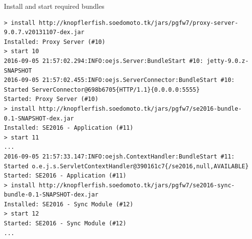 \documentclass[conference]{IEEEtran}
\begin{document}
\begin{listing}
    \caption{Install and start required bundles}
    \begin{verbatim}
> install http://knopflerfish.soedomoto.tk/jars/pgfw7/proxy-server-9.0.7.v20131107-dex.jar
Installed: Proxy Server (#10)
> start 10
2016-09-05 21:57:02.294:INFO:oejs.Server:BundleStart #10: jetty-9.0.z-SNAPSHOT
2016-09-05 21:57:02.455:INFO:oejs.ServerConnector:BundleStart #10: Started ServerConnector@698b6705{HTTP/1.1}{0.0.0.0:5555}
Started: Proxy Server (#10)
> install http://knopflerfish.soedomoto.tk/jars/pgfw7/se2016-bundle-0.1-SNAPSHOT-dex.jar
Installed: SE2016 - Application (#11)
> start 11
...
2016-09-05 21:57:33.147:INFO:oejsh.ContextHandler:BundleStart #11: Started o.e.j.s.ServletContextHandler@390161c7{/se2016,null,AVAILABLE}
Started: SE2016 - Application (#11)
> install http://knopflerfish.soedomoto.tk/jars/pgfw7/se2016-sync-bundle-0.1-SNAPSHOT-dex.jar
Installed: SE2016 - Sync Module (#12)
> start 12
Started: SE2016 - Sync Module (#12)
...
	\end{verbatim}
    \label{lst:start-bundle-remote}
\end{listing}




%
%

\end{document}
